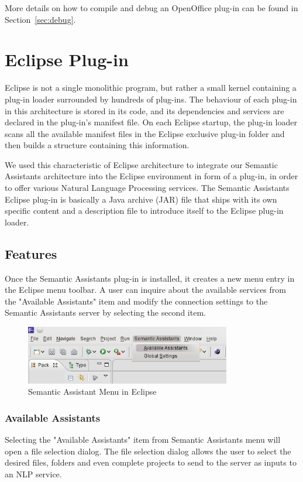 More details on how to compile and debug an OpenOffice plug-in can be found in
Section~\ref{sec:debug}.
 
\section{Eclipse Plug-in}
Eclipse is not a single monolithic program, but rather a small kernel containing
a plug-in loader surrounded by hundreds of plug-ins. The behaviour of each
plug-in in this architecture is stored in its code, and its dependencies and
services are declared in the plug-in's manifest file. On each Eclipse startup,
the plug-in loader scans all the available manifest files in the Eclipse
exclusive plug-in folder and then builds a structure containing this
information.

We used this characteristic of Eclipse architecture to integrate our Semantic
Assistants architecture into the Eclipse environment in form of a plug-in, in
order to offer various Natural Language Processing services. The Semantic
Assistants Eclipse plug-in is basically a Java archive (JAR) file that ships
with its own specific content and a description file to introduce itself to the
Eclipse plug-in loader. 

\subsection{Features}
Once the Semantic Assistants plug-in is installed, it creates a new menu entry
in the Eclipse menu toolbar. A user can inquire about the available services
from the "Available Assistants" item and modify the connection settings to the
Semantic Assistants server by selecting the second item.
\begin{figure}[htb]
\begin{center}
  \includegraphics[width=0.8\textwidth]{pictures/eclipse_menu.jpg}
  \caption{Semantic Assistant Menu in Eclipse}
  \label{fig:eclipse_menu}
\end{center}
\end{figure}
\subsubsection{Available Assistants}
Selecting the "Available Assistants" item from Semantic Assistants menu will
open a file selection dialog. The file selection dialog allows the user to
select the desired files, folders and even complete projects to send to the
server as inputs to an NLP service.

